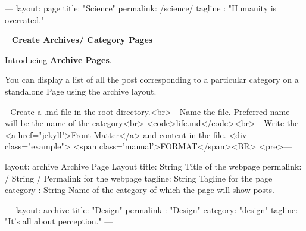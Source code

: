  
\begin{DoxyPre}---
layout: page
title:  "Science"
permalink:   /science/
tagline : "Humanity is overrated."
---\end{DoxyPre}
 

  

~\newline
   {\bfseries Create Archives/ Category Pages}~\newline
 ~\newline
  

 Introducing {\bfseries Archive Pages}.~\newline


  You can display a list of all the post corresponding to a particular category on a standalone Page using the {\ttfamily \textquotesingle{}archive\textquotesingle{}} layout.   ~\newline




  \begin{DoxyVerb}  - Create a .md file in the root directory.<br>
  - Name the file. Preferred name will be the name of the category<br>  <code>life.md</code><br>
  - Write the <a href="jekyll">Front Matter</a> and content in the file.
  <div class="example">
    <span class='manual'>FORMAT</span><BR>
<pre>---
\end{DoxyVerb}
 layout\+: archive Archive Page Layout title\+: String Title of the webpage permalink\+: / String / Permalink for the webpage tagline\+: String  Tagline for the page category \+: String  Name of the category of which the page will show posts. ---  

 
\begin{DoxyPre}---
layout: archive
title:  "Design"
permalink : "Design"
category: "design"
tagline: "It's all about perception."
---\end{DoxyPre}
 ~\newline
  